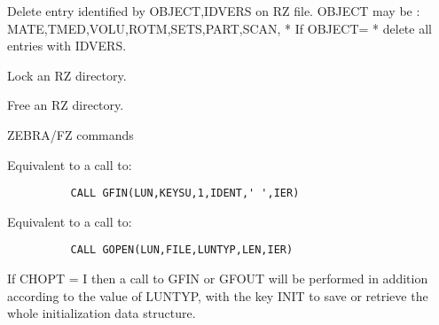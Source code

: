    \par
Delete entry identified by OBJECT,IDVERS on RZ file.  OBJECT may be : 
   MATE,TMED,VOLU,ROTM,SETS,PART,SCAN, * If OBJECT= *    delete all entries 
   with IDVERS.  

\ENDCMD


\BEGARG
{}
\ENDARG

   \par
Lock an RZ directory.  

\ENDCMD


\BEGARG
{}
\ENDARG

   \par
Free an RZ directory.  

\ENDCMD
\newpage
{}
\ifMENUtext
   \par
ZEBRA/FZ commands 


\fi


\BEGARG
{}
\ENDARG

   \par
Equivalent to a call to:  
\begin{verbatim}
          CALL GFIN(LUN,KEYSU,1,IDENT,' ',IER)
\end{verbatim}

\ENDCMD


\BEGARG
{}
\ENDARG

   \par
Equivalent to a call to:  
\begin{verbatim}
          CALL GOPEN(LUN,FILE,LUNTYP,LEN,IER)
\end{verbatim}
   \par
If CHOPT = I then a call to GFIN or GFOUT will be performed in addition 
   according to the value of LUNTYP, with the key INIT to save or retrieve the 
   whole initialization data structure.  

